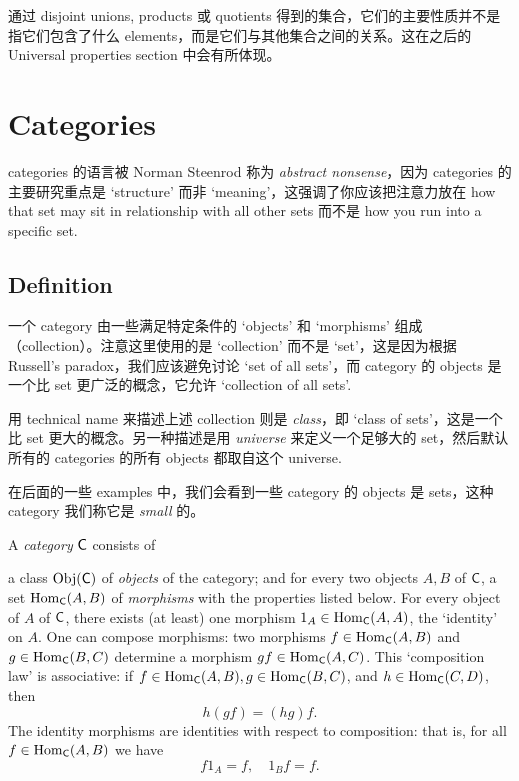 通过 disjoint unions, products 或 quotients 得到的集合，它们的主要性质并不是指它们包含了什么 elements，而是它们与其他集合之间的关系。这在之后的 Universal properties section 中会有所体现。

\section{Categories}\label{1.3}

categories 的语言被 Norman Steenrod 称为 \emph{abstract nonsense}，因为 categories 的主要研究重点是 `structure' 而非 `meaning'，这强调了你应该把注意力放在 how that set may sit in relationship with all other sets 而不是 how you run into a specific set.

\subsection{Definition}\label{sec:1.3.1}

一个 category 由一些满足特定条件的 `objects' 和 `morphisms' 组成（collection）。注意这里使用的是 `collection' 而不是 `set'，这是因为根据 Russell's paradox，我们应该避免讨论 `set of all sets'，而 category 的 objects 是一个比 set 更广泛的概念，它允许 `collection of all sets'.

用 technical name 来描述上述 collection 则是 \emph{class}，即 `class of sets'，这是一个比 set 更大的概念。另一种描述是用 \emph{universe} 来定义一个足够大的 set，然后默认所有的 categories 的所有 objects 都取自这个 universe.

在后面的一些 examples 中，我们会看到一些 category 的 objects 是 sets，这种 category 我们称它是 \emph{small} 的。

\begin{definition}[Category]\label{def:category}
    A \emph{category} $\operatorname{\mathsf{C}}$ consists of
    \begin{outline}
        \1 a class $\operatorname{Obj}(\operatorname{\mathsf{C}})$ of \emph{objects} of the category; and
        \1 for every two objects $A, B$ of $\operatorname{\mathsf{C}}$, a set $\operatorname{Hom}_{\operatorname{\mathsf{C}}}(A, B)$ of \emph{morphisms} with the properties listed below.
        \2 For every object of $A$ of $\operatorname{\mathsf{C}}$, there exists (at least) one morphism $1_A \in \operatorname{Hom}_{\operatorname{\mathsf{C}}}(A, A)$, the `identity' on $A$.
        \2 One can compose morphisms: two morphisms $f \in \operatorname{Hom}_{\operatorname{\mathsf{C}}}(A, B)$ and $g \in \operatorname{Hom}_{\operatorname{\mathsf{C}}}(B, C)$ determine a morphism $gf \in \operatorname{Hom}_{\operatorname{\mathsf{C}}}(A, C)$.
        \2 This `composition law' is associative: if \(f \in \operatorname{Hom}_{\operatorname{\mathsf{C}}}(A, B), g \in \operatorname{Hom}_{\operatorname{\mathsf{C}}}(B, C)\), and \(h \in \operatorname{Hom}_{\operatorname{\mathsf{C}}}(C, D)\), then
        \[
            h(gf) = (hg)f.
        \]
        \2 The identity morphisms are identities with respect to composition: that is, for all \(f \in \operatorname{Hom}_{\operatorname{\mathsf{C}}}(A, B)\) we have
        \[
            f 1_A = f, \quad 1_B f = f.
        \]
    \end{outline}
\end{definition}

